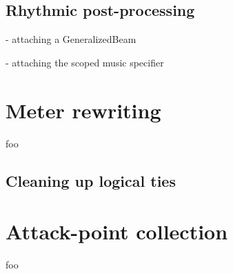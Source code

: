\subsection{Rhythmic post-processing}

- attaching a GeneralizedBeam

- attaching the scoped music specifier

\section{Meter rewriting}

foo

\subsection{Cleaning up logical ties}

\section{Attack-point collection}

foo